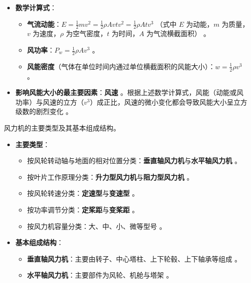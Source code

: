 \begin{solution}
\begin{itemize}
\item \textbf{数学计算式}：
\begin{itemize}
\item \textbf{气流动能}：\(E=\frac{1}{2}mv^{2}=\frac{1}{2}\rho Avtv^{2}=\frac{1}{2}\rho Atv^{3}\) （式中 \(E\) 为动能，\(m\) 为质量，\(v\) 为速度，\(\rho\) 为空气密度，\(t\) 为时间，\(A\) 为气流横截面积） 。
\item \textbf{风功率}：\(P_{w}=\frac{1}{2}\rho Av^{3}\) 。
\item \textbf{风能密度}（气体在单位时间内通过单位横截面积的风能大小）：\(w=\frac{1}{2}\rho v^{3}\) 。
\end{itemize}
\item \textbf{影响风能大小的最主要因素}：\textbf{风速} 。根据上述数学计算式，风能（动能或风功率）与风速的立方（\(v^3\)）成正比，风速的微小变化都会导致风能大小呈立方级数的剧烈变化 。
\end{itemize}
\end{solution}

\begin{problem}\label{exer:think_03_wind_04}
风力机的主要类型及其基本组成结构。
\end{problem}

\begin{solution}
\begin{itemize}
\item \textbf{主要类型}：
\begin{itemize}
\item 按风轮转动轴与地面的相对位置分类：\textbf{垂直轴风力机}与\textbf{水平轴风力机} 。
\item 按叶片工作原理分类：\textbf{升力型风力机}与\textbf{阻力型风力机} 。
\item 按风轮转速分类：\textbf{定速型}与\textbf{变速型} 。
\item 按功率调节分类：\textbf{定桨距}与\textbf{变桨距} 。
\item 按风力机容量分类：大、中、小、微等型号 。
\end{itemize}
\item \textbf{基本组成结构}：
\begin{itemize}
\item \textbf{垂直轴风力机}：主要由转子、中心塔柱、上下轮毂、上下轴承等组成 。
\item \textbf{水平轴风力机}：主要部件为风轮、机舱与塔架 。
\end{itemize}
\end{itemize}
\end{solution}

